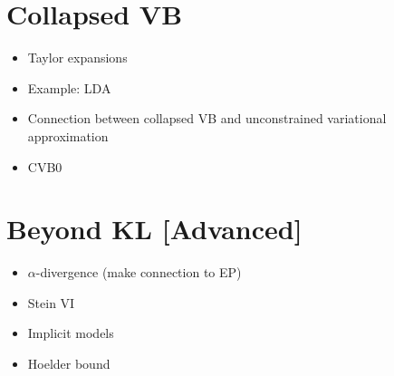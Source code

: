 \documentclass[11pt, a4paper]{article}
\begin{document}
\section{Collapsed VB}


\begin{itemize}
\item Taylor expansions
\item Example: LDA
\item Connection between collapsed VB and unconstrained variational approximation \citep{TehEtAl:2007}
\item CVB0 \citep{AsuncionEtAl:2009}
\end{itemize}

\section{Beyond KL [Advanced]}
\begin{itemize}
\item $ \alpha $-divergence (make connection to EP)
\item Stein VI
\item Implicit models
\item Hoelder bound
\end{itemize}





\end{document}
